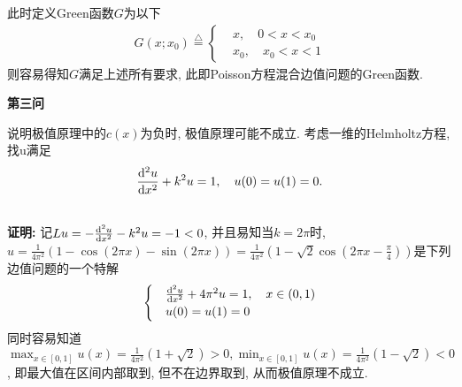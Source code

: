\documentclass[12pt]{article}
\begin{document}
\noindent 此时定义Green函数$G$为以下
\begin{align*}
	G(x;x_0)\overset{\triangle}{=}\begin{cases}
		&x,\quad 0<x<x_0\\
		&x_0,\quad x_0<x<1
	\end{cases}
\end{align*}
\noindent 则容易得知$G$满足上述所有要求, 此即Poisson方程混合边值问题的Green函数.













\begin{center}
	\textbf{第三问}
\end{center}
\noindent 说明极值原理中的$c(x)$为负时, 极值原理可能不成立. 考虑一维的Helmholtz方程, 找u满足$$\frac{{\rm d}^2 u}{{\rm d}x^2}+k^2u=1,\quad u(0)=u(1)=0.$$

\quad \\
\textbf{证明:} 记$Lu=-\frac{{\rm d}^2 u}{{\rm d}x^2}-k^2u=-1<0$, 并且易知当$k=2\pi$时, $u=\frac{1}{4\pi^2}(1-\cos(2\pi x)-\sin(2\pi x))=\frac{1}{4\pi^2}(1-\sqrt{2}\cos(2\pi x-\frac{\pi}{4}))$是下列边值问题的一个特解
\begin{align*}
	\begin{cases}
		&\frac{{\rm d}^2u}{{\rm d}x^2}+4\pi^2u=1,\quad x\in(0,1)\\
		&u(0)=u(1)=0
	\end{cases}
\end{align*}
\noindent 同时容易知道$\max_{x\in[0,1]}u(x)=\frac{1}{4\pi^2}(1+\sqrt{2})>0, \min_{x\in[0,1]}u(x)=\frac{1}{4\pi^2}(1-\sqrt{2})<0$, 即最大值在区间内部取到, 但不在边界取到, 从而极值原理不成立.\\

\quad \\
\end{document}
